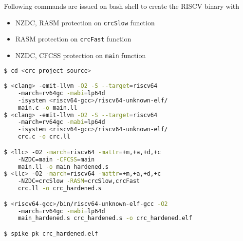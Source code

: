 Following commands are issued on bash shell to create the RISCV binary with
\begin{itemize}
 \item NZDC, RASM protection on \texttt{crcSlow} function
 \item RASM protection on \texttt{crcFast} function
 \item NZDC, CFCSS protection on \texttt{main} function
\end{itemize}

\begin{framed}
 \begin{lstlisting}[language=bash, basicstyle=\small\ttfamily]
$ cd <crc-project-source>

$ <clang> -emit-llvm -O2 -S --target=riscv64
    -march=rv64gc -mabi=lp64d
    -isystem <riscv64-gcc>/riscv64-unknown-elf/
    main.c -o main.ll
$ <clang> -emit-llvm -O2 -S --target=riscv64
    -march=rv64gc -mabi=lp64d
    -isystem <riscv64-gcc>/riscv64-unknown-elf/
    crc.c -o crc.ll

$ <llc> -O2 -march=riscv64 -mattr=+m,+a,+d,+c
    -NZDC=main -CFCSS=main
    main.ll -o main_hardened.s
$ <llc> -O2 -march=riscv64 -mattr=+m,+a,+d,+c
    -NZDC=crcSlow -RASM=crcSlow,crcFast
    crc.ll -o crc_hardened.s

$ <riscv64-gcc>/bin/riscv64-unknown-elf-gcc -O2
    -march=rv64gc -mabi=lp64d
    main_hardened.s crc_hardened.s -o crc_hardened.elf

$ spike pk crc_hardened.elf

\end{lstlisting}
\end{framed}

